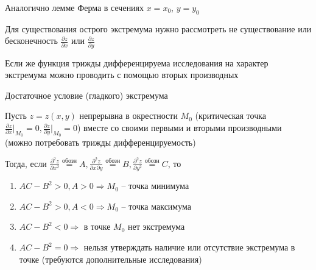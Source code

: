 \documentclass[12pt]{article}
\begin{document}
    \begin{MyProof}
        Аналогично лемме Ферма в сечениях $x = x_0$, $y = y_0$
    \end{MyProof}
    
    Для существования острого экстремума нужно рассмотреть не существование или бесконечность $\frac{\partial z}{\partial x}$ или $\frac{\partial z}{\partial y}$

    Если же функция трижды дифференцируема исследования на характер экстремума можно проводить с помощью вторых производных

    \hypertarget{extremumsufficientcondition}{}

    \begin{MyTheorem}
        \Ths Достаточное условие (гладкого) экстремума

        Пусть $z = z(x, y)$ непрерывна в окрестности $M_0$ (критическая точка $\frac{\partial z}{\partial x} \Big|_{M_0} = 0, \frac{\partial z}{\partial y} \Big|_{M_0} = 0$)
        вместе со своими первыми и вторыми производными (можно потребовать трижды дифференцируемость)

        Тогда, если $\frac{\partial^2 z}{\partial x^2} \stackrel{\text{обозн}}{=} A, \frac{\partial^2 z}{\partial x \partial y} \stackrel{\text{обозн}}{=} B, \frac{\partial^2 z}{\partial y^2} \stackrel{\text{обозн}}{=} C$, то

        \begin{enumerate}
            \item $AC - B^2 > 0, A > 0 \Longrightarrow M_0$ -- точка минимума
            \item $AC - B^2 > 0, A < 0 \Longrightarrow M_0$ -- точка максимума
            \item $AC - B^2 < 0 \Longrightarrow$ в точке $M_0$ нет экстремума
            \item $AC - B^2 = 0\Longrightarrow$ нельзя утверждать наличие или отсутствие экстремума в точке (требуются дополнительные исследования)
        \end{enumerate}
    \end{MyTheorem}
\end{document}
